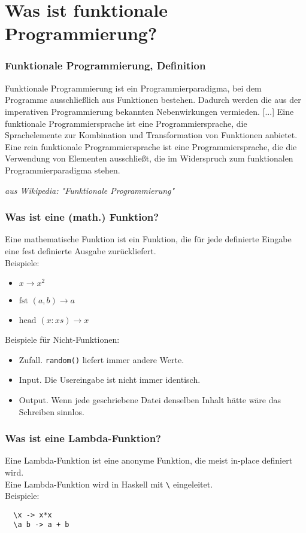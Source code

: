 \documentclass[10pt]{beamer}
\begin{document}
\section{Was ist funktionale Programmierung?}

\begin{frame}[fragile]
 \frametitle{Funktionale Programmierung, Definition}
 Funktionale Programmierung ist ein Programmierparadigma, bei dem Programme ausschließlich aus Funktionen bestehen. 
 Dadurch werden die aus der imperativen Programmierung bekannten Nebenwirkungen vermieden. [...] 
 Eine funktionale Programmiersprache ist eine Programmiersprache, die Sprachelemente zur Kombination und Transformation 
 von Funktionen anbietet. Eine rein funktionale Programmiersprache ist eine Programmiersprache, die die Verwendung von 
 Elementen ausschließt, die im Widerspruch zum funktionalen Programmierparadigma stehen.\\
 \begin{flushright}
  \tiny \it aus Wikipedia: "Funktionale Programmierung"
 \end{flushright}
\end{frame}

\begin{frame}[fragile]
 \frametitle{Was ist eine (math.) Funktion?}
 Eine mathematische Funktion ist ein Funktion, die für jede definierte Eingabe eine fest definierte Ausgabe zurückliefert.\\\vspace*{0.5cm}
 \pause
 Beispiele:
 \pause
 \begin{itemize}
  \item $x \rightarrow x^2$
  \pause
  \item $\textrm{fst } (a,b) \rightarrow a$
  \pause
  \item $\textrm{head } (x:xs) \rightarrow x$
 \end{itemize}
 \pause
 Beispiele für Nicht-Funktionen:
 \pause
 \begin{itemize}
  \item Zufall. \texttt{random()} liefert immer andere Werte.
  \pause
  \item Input. Die Usereingabe ist nicht immer identisch.
  \pause
  \item Output. Wenn jede geschriebene Datei denselben Inhalt hätte wäre das Schreiben sinnlos.
 \end{itemize}
\end{frame}

\begin{frame}[fragile]
 \frametitle{Was ist eine Lambda-Funktion?}
 Eine Lambda-Funktion ist eine anonyme Funktion, die meist in-place definiert wird.\\
 \pause
 Eine Lambda-Funktion wird in Haskell mit \texttt{\textbackslash} eingeleitet.\\\vspace*{0.5cm}
 \pause
 Beispiele:
 \pause
 \begin{lstlisting}
  \x -> x*x
  \a b -> a + b
 \end{lstlisting}
\end{frame}
\end{document}
